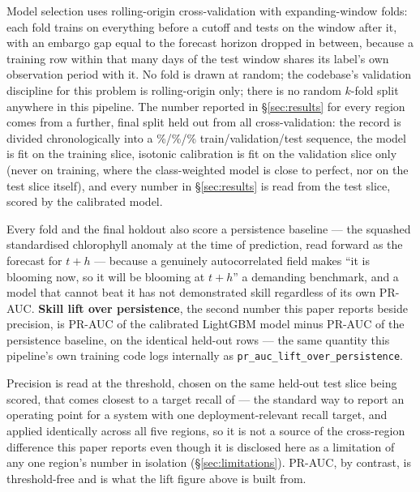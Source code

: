  Model selection uses rolling-origin cross-validation
with \HabNSplits{} expanding-window folds: each fold trains on everything
before a cutoff and tests on the window after it, with an embargo gap equal
to the forecast horizon dropped in between, because a training row within
that many days of the test window shares its label's own observation period
with it. No fold is drawn at random; the codebase's validation discipline for
this problem is rolling-origin only; there is no random $k$-fold split
anywhere in this pipeline. The number reported in
\S\ref{sec:results} for every region comes from a further, final split held
out from all cross-validation: the record is divided chronologically into a
\HabTrainPct{}\%/\HabValPct{}\%/\HabTestPct{}\% train/validation/test
sequence, the model is fit on the training slice, isotonic calibration is
fit on the validation slice only (never on training, where the
class-weighted model is close to perfect, nor on the test slice itself), and
every number in \S\ref{sec:results} is read from the test slice, scored by
the calibrated model.

 Every fold and the final holdout also score a
persistence baseline --- the squashed standardised chlorophyll anomaly at
the time of prediction, read forward as the forecast for $t+h$ --- because a
genuinely autocorrelated field makes ``it is blooming now, so it will be
blooming at $t+h$'' a demanding benchmark, and a model that cannot beat it
has not demonstrated skill regardless of its own PR-AUC. \textbf{Skill lift
over persistence}, the second number this paper reports beside precision, is
PR-AUC of the calibrated LightGBM model minus PR-AUC of the persistence
baseline, on the identical held-out rows --- the same quantity this
pipeline's own training code logs internally as
\texttt{pr\_auc\_lift\_over\_persistence}.

 Precision is read at the threshold, chosen on the
same held-out test slice being scored, that comes closest to a target recall
of \HabTargetRecall{} --- the standard way to report an operating point for
a system with one deployment-relevant recall target, and applied identically
across all five regions, so it is not a source of the cross-region
difference this paper reports even though it is disclosed here as a
limitation of any one region's number in isolation (\S\ref{sec:limitations}).
PR-AUC, by contrast, is threshold-free and is what the lift figure above is
built from.

